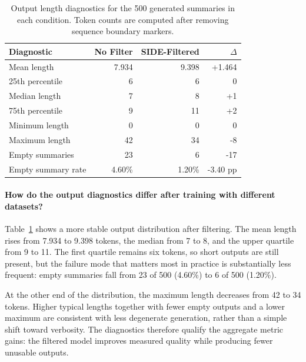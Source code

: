 \begin{table}[t]
\centering
\caption{Output length diagnostics for the 500 generated summaries in each condition. Token counts are computed after removing sequence boundary markers.}
\label{tab:output_diagnostics}
\small
\begin{tabular}{lrrr}
\hline
\textbf{Diagnostic} & \textbf{No Filter} & \textbf{SIDE-Filtered} & \textbf{$\Delta$} \\
\hline
Mean length & 7.934 & 9.398 & +1.464 \\
25th percentile & 6 & 6 & 0 \\
Median length & 7 & 8 & +1 \\
75th percentile & 9 & 11 & +2 \\
Minimum length & 0 & 0 & 0 \\
Maximum length & 42 & 34 & -8 \\
Empty summaries & 23 & 6 & -17 \\
Empty summary rate & 4.60\% & 1.20\% & -3.40 pp \\
\hline
\end{tabular}
\end{table}

\paragraph{\textbf{How do the output diagnostics differ after training with different datasets?}} Table~\ref{tab:output_diagnostics} shows a more stable output distribution after filtering. The mean length rises from 7.934 to 9.398 tokens, the median from 7 to 8, and the upper quartile from 9 to 11. The first quartile remains six tokens, so short outputs are still present, but the failure mode that matters most in practice is substantially less frequent: empty summaries fall from 23 of 500 (4.60\%) to 6 of 500 (1.20\%).

At the other end of the distribution, the maximum length decreases from 42 to 34 tokens. Higher typical lengths together with fewer empty outputs and a lower maximum are consistent with less degenerate generation, rather than a simple shift toward verbosity. The diagnostics therefore qualify the aggregate metric gains: the filtered model improves measured quality while producing fewer unusable outputs.
